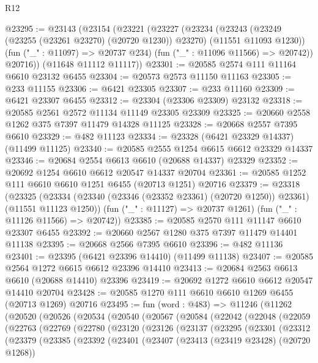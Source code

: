\begin{lexlean}{R12}
\begin{coremodule}
@23295 := @23143
    (@23154
      (@23221
        (@23227
          (@23234
            (@23243 (@23249 (@23255 (@23261 @23270) (@20720 @1230)) @23270) (@11551 @11093 @1230))
            (fun ("_" : @11097) => @20737 @234)
            (fun ("_" : @11096 @11566) => @20742))
          @20716))
      (@11648 @11112 @11117))
@23301 := @20585 @2574 @111 @11164 @6610 @23132 @6455
@23304 := @20573 @2573 @11150 @11163
@23305 := @233 @11155
@23306 := @6421 @23305
@23307 := @233 @11160
@23309 := @6421 @23307 @6455
@23312 := @23304 (@23306 @23309) @23132
@23318 := @20585 @2561 @2572 @11134 @11149 @23305 @23309
@23325 := @20660 @2558 @1262 @375 @7397 @11479 @14328 @11125
@23328 := @20668 @2557 @7395 @6610
@23329 := @482 @11123
@23334 := @23328 (@6421 @23329 @14337) (@11499 @11125)
@23340 := @20585 @2555 @1254 @6615 @6612 @23329 @14337
@23346 := @20684 @2554 @6613 @6610 (@20688 @14337) @23329
@23352 := @20692 @1254 @6610 @6612 @20547 @14337 @20704
@23361 := @20585 @1252 @111 @6610 @6610 @1251 @6455 (@20713 @1251) @20716
@23379 := @23318
    (@23325
      (@23334 (@23340 (@23346 (@23352 @23361) (@20720 @1250)) @23361) (@11551 @11123 @1250))
      (fun ("_" : @11127) => @20737 @1261)
      (fun ("_" : @11126 @11566) => @20742))
@23385 := @20585 @2570 @111 @11147 @6610 @23307 @6455
@23392 := @20660 @2567 @1280 @375 @7397 @11479 @14401 @11138
@23395 := @20668 @2566 @7395 @6610
@23396 := @482 @11136
@23401 := @23395 (@6421 @23396 @14410) (@11499 @11138)
@23407 := @20585 @2564 @1272 @6615 @6612 @23396 @14410
@23413 := @20684 @2563 @6613 @6610 (@20688 @14410) @23396
@23419 := @20692 @1272 @6610 @6612 @20547 @14410 @20704
@23428 := @20585 @1270 @111 @6610 @6610 @1269 @6455 (@20713 @1269) @20716
@23495 := fun (word : @483) =>
  @11246
    (@11262
      (@20520
        (@20526
          (@20534
            (@20540
              (@20567
                (@20584
                  (@22042
                    (@22048
                      (@22059
                        (@22763
                          (@22769
                            (@22780
                              (@23120
                                (@23126
                                  (@23137
                                    (@23295
                                      (@23301
                                        (@23312
                                          (@23379
                                            (@23385
                                              (@23392
                                                (@23401
                                                  (@23407
                                                    (@23413 (@23419 @23428) (@20720 @1268))

\end{coremodule}
\end{lexlean}

